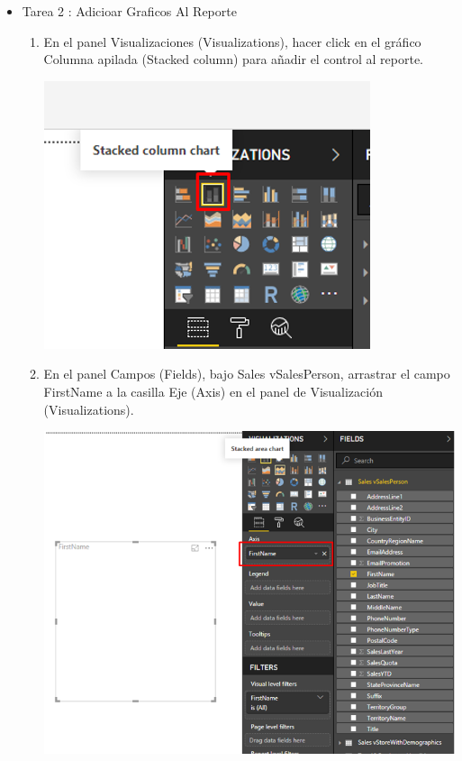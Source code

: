 \begin{itemize}
\item Tarea 2 : Adicioar Graficos Al Reporte
\begin{enumerate}

\item En el panel Visualizaciones (Visualizations), hacer click en el gráfico Columna apilada (Stacked column) para añadir el control al reporte.
\begin{center}
\includegraphics[scale=0.55]{./Imagenes/1.png}
\end{center}


\item En el panel Campos (Fields), bajo Sales vSalesPerson, arrastrar el campo FirstName a la casilla Eje (Axis) en el panel de Visualización (Visualizations).
\begin{center}
\includegraphics[scale=0.55]{./Imagenes/2.png}
\end{center}


\end{enumerate}
\end{itemize}
